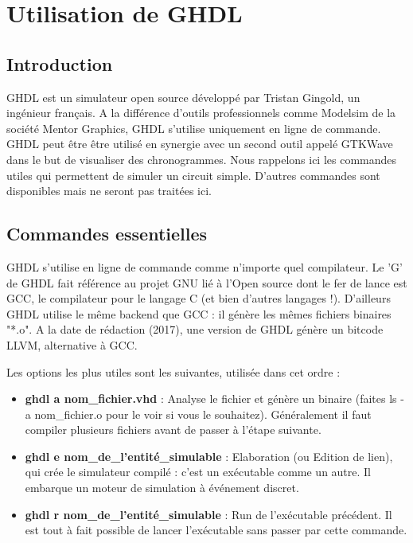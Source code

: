 \chapter*{Utilisation de GHDL}


\section{Introduction}
GHDL est un simulateur open source développé par Tristan Gingold, un ingénieur français.
A la différence d'outils professionnels comme Modelsim de la société Mentor Graphics, GHDL s'utilise
uniquement en ligne de commande. GHDL peut être être utilisé en synergie avec un second outil appelé GTKWave dans le but de visualiser des chronogrammes.
Nous rappelons ici les commandes utiles qui permettent de simuler un circuit simple.
D'autres commandes sont disponibles mais ne seront pas traitées ici.

\section{Commandes essentielles}


GHDL s'utilise en ligne de commande comme n'importe quel compilateur.
Le 'G' de GHDL fait référence au projet GNU lié à l'Open source dont le fer de lance est GCC, le compilateur pour le langage C (et bien d'autres langages !).
D'ailleurs GHDL utilise le même backend que GCC : il génère les mêmes fichiers binaires "*.o". A la date de rédaction (2017), une version de GHDL génère un bitcode
LLVM, alternative à GCC.

Les options les plus utiles sont les suivantes, utilisée dans cet ordre :
\begin{itemize}
  \item \textbf{ghdl \-a nom\_fichier.vhd} : Analyse le fichier et génère un binaire (faites ls -a nom\_fichier.o pour le voir si vous le souhaitez). Généralement il faut compiler plusieurs fichiers avant de passer à l'étape suivante.
 \item \textbf{ghdl \-e nom\_de\_l'entité\_simulable}  : Elaboration (ou Edition de lien), qui crée le simulateur compilé : c'est un exécutable comme un autre. Il embarque un moteur de simulation à événement discret.
\item \textbf{ghdl \-r nom\_de\_l'entité\_simulable}  : Run de l'exécutable précédent. Il est tout à fait possible de lancer l'exécutable sans passer par cette commande.
\end{itemize}

